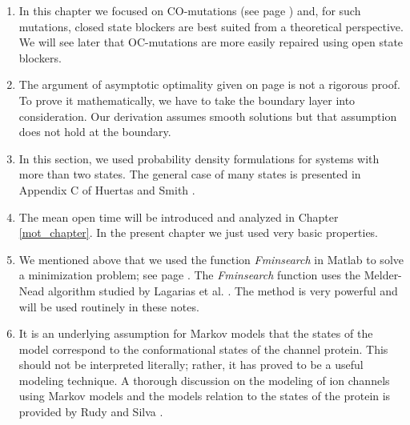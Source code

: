 \begin{enumerate}
\item In this chapter we focused on CO-mutations (see page \pageref{com}) and, for such mutations, closed state blockers are best suited from a theoretical perspective. We will see later that OC-mutations are more easily repaired using open state blockers.
\item The argument of asymptotic optimality given on page \pageref{asymptotic} is not a rigorous proof. To prove it mathematically, we have to take the boundary layer into consideration. Our derivation assumes smooth solutions but that assumption does not hold at the boundary.
\item In this section, we used probability density formulations for systems with more than two states. The general  case of many states is presented in Appendix C of  Huertas and Smith \cite{Huertas2007}.
\item The mean open time will be introduced and analyzed in Chapter \ref{mot_chapter}. In the present chapter we just used very basic properties.
\item We mentioned above that we used the function \textit{Fminsearch} in Matlab to solve a minimization problem; see page  \pageref{Fminsearch}. The \textit{Fminsearch} function uses the Melder-Nead \cite{Nelder1965} algorithm studied by Lagarias et al. \cite{Lagarias1998}. The method is very powerful and will be used routinely in these notes. 
\item It is an underlying assumption for Markov models that the states of the model correspond to the conformational states of the channel protein. This should not be interpreted literally; rather, it has proved to be a useful modeling technique. A thorough discussion on the modeling of ion channels using Markov models and the models relation to the states of the protein is provided by Rudy and Silva \cite{Rudy2006}.
\end{enumerate}

